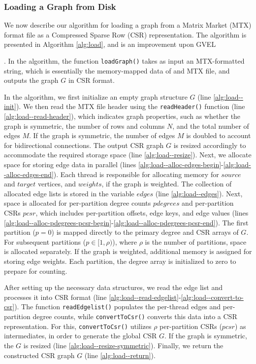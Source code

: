 



\subsubsection{Loading a Graph from Disk}
\label{sec:load}

We now describe our algorithm for loading a graph from a Matrix Market (MTX) format file as a Compressed Sparse Row (CSR) representation. The algorithm is presented in Algorithm \ref{alg:load}, and is an improvement upon GVEL \cite{sahu2023gvel}. In the algorithm, the function \texttt{loadGraph()} takes as input an MTX-formatted string, which is essentially the memory-mapped data of and MTX file, and outputs the graph $G$ in CSR format.

In the algorithm, we first initialize an empty graph structure $G$ (line \ref{alg:load--init}). We then read the MTX file header using the \texttt{readHeader()} function (line \ref{alg:load--read-header}), which indicates graph properties, such as whether the graph is symmetric, the number of rows and columns $N$, and the total number of edges $M$. If the graph is symmetric, the number of edges $M$ is doubled to account for bidirectional connections. The output CSR graph $G$ is resized accordingly to accommodate the required storage space (line \ref{alg:load--resize}).
%
Next, we allocate space for storing edge data in parallel (lines \ref{alg:load--alloc-edges-begin}-\ref{alg:load--alloc-edges-end}). Each thread is responsible for allocating memory for $source$ and $target$ vertices, and $weights$, if the graph is weighted. The collection of allocated edge lists is stored in the variable $edges$ (line \ref{alg:load--edges}). Next, space is allocated for per-partition degree counts $pdegrees$ and per-partition CSRs $pcsr$, which includes per-partition offsets, edge keys, and edge values (lines \ref{alg:load--alloc-pdegrees-pcsr-begin}-\ref{alg:load--alloc-pdegrees-pcsr-end}). The first partition ($p=0$) is mapped directly to the primary degree and CSR arrays of $G$. For subsequent partitions ($p \in [1, \rho)$), where $\rho$ is the number of partitions, space is allocated separately. If the graph is weighted, additional memory is assigned for storing edge weights. Each partition, the degree array is initialized to zero to prepare for counting.

After setting up the necessary data structures, we read the edge list and processes it into CSR format (line \ref{alg:load--read-edgelist}-\ref{alg:load--convert-to-csr}). The function \texttt{readEdgelist()} populates the per-thread edges and per-partition degree counts, while \texttt{convertToCsr()} converts this data into a CSR representation. For this, \texttt{convertToCsr()} utilizes $\rho$ per-partition CSRs ($pcsr$) as intermediates, in order to generate the global CSR $G$. If the graph is symmetric, the $G$ is resized (line \ref{alg:load--resize-symmetric}). Finally, we return the constructed CSR graph $G$ (line \ref{alg:load--return}).

